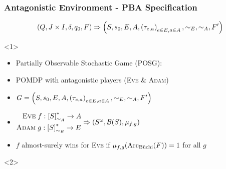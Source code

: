\documentclass{beamer}
\newcommand{\adam}{\textsc{Adam}}
\newcommand{\eve}{\textsc{Eve}}
\begin{document}
 \begin{frame}
    \frametitle{Antagonistic Environment - \ac{PBA} Specification}
    \begin{overlayarea}{\textwidth}{0.2\textheight}
      \begin{equation*}
        \left(Q, J\times I, \delta, q_{0}, F\right)\Rightarrow\left(S, s_{0}, E, A,
          \left(\tau_{e,a}\right)_{e\in E, a\in A}, \sim_{E}, \sim_{A}, F'\right)
      \end{equation*}
    \end{overlayarea}
    \begin{overlayarea}{\textwidth}{0.8\textheight}
      \begin{onlyenv}<1>
        \begin{itemize}
          \item Partially Observable Stochastic Game (\ac{POSG}):
          \item \ac{POMDP} with antagonistic players (\eve{} \& \adam{})
          \item $G = \left(S, s_{0}, E, A,
            \left(\tau_{e,a}\right)_{e\in E, a\in A}, \sim_{E}, \sim_{A}, F'\right)$
          \item
            $\begin{aligned}
              \eve{}\; &f:\interval{S}_{\sim_{A}}^{*}\rightarrow A\\
              \adam{}\; &g:\interval{S}_{\sim_{E}}^{*}\rightarrow E
            \end{aligned} \Rightarrow \tuple{S^{\omega}, \mathcal{B}(S), 
            \mu_{f,g}}$
          \item $f$ almost-surely wins for \eve{} if
            $\mu_{f,g}(\operatorname{Acc}_{\operatorname{B\ddot{u}chi}}(F)) = 1$ for all $g$
        \end{itemize}
      \end{onlyenv}
      \begin{onlyenv}<2>
\end{onlyenv}
\end{overlayarea}
\end{frame}
\end{document}
